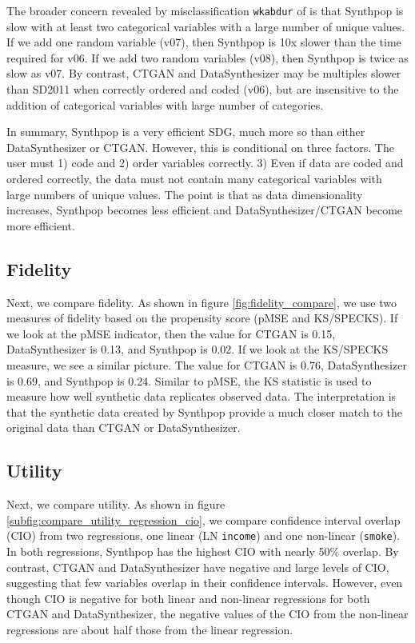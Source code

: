 \documentclass[runningheads]{llncs}
\begin{document}
The broader concern revealed by misclassification \texttt{wkabdur} of is that Synthpop is slow with at least two categorical variables with a large number of unique values.  If we add one random variable (v07), then Synthpop is 10x slower than the time required for v06.  If we add two random variables (v08), then Synthpop is twice as slow as v07.  By contrast, CTGAN and DataSynthesizer may be multiples slower than SD2011 when correctly ordered and coded (v06), but are insensitive to the addition of categorical variables with large number of categories.  

In summary, Synthpop is a very efficient SDG, much more so than either DataSynthesizer or CTGAN.  However, this is conditional on three factors.  The user must 1) code and 2) order variables correctly.  3) Even if data are coded and ordered correctly, the data must not contain many categorical variables with large numbers of unique values.  The point is that as data dimensionality increases, Synthpop becomes less efficient and DataSynthesizer/CTGAN become more efficient.

\subsection{Fidelity}

Next, we compare fidelity.  As shown in figure \ref{fig:fidelity_compare}, we use two measures of fidelity based on the propensity score (pMSE and KS/SPECKS).  If we look at the pMSE indicator, then the value for CTGAN is 0.15, DataSynthesizer is 0.13, and Synthpop is 0.02.  If we look at the KS/SPECKS measure, we see a similar picture.  The value for CTGAN is 0.76, DataSynthesizer is 0.69, and Synthpop is 0.24.  Similar to pMSE, the KS statistic is used to measure how well synthetic data replicates observed data.  The interpretation is that the synthetic data created by Synthpop provide a much closer match to the original data than CTGAN or DataSynthesizer.  

\subsection{Utility}

Next, we compare utility.  As shown in figure \ref{subfig:compare_utility_regression_cio}, we compare confidence interval overlap (CIO) from two regressions, one linear (LN \texttt{income}) and one non-linear (\texttt{smoke}).  In both regressions, Synthpop has the highest CIO with nearly 50\% overlap.  By contrast, CTGAN and DataSynthesizer have negative and large levels of CIO, suggesting that few variables overlap in their confidence intervals.  However, even though CIO is negative for both linear and non-linear regressions for both CTGAN and DataSynthesizer, the negative values of the CIO from the non-linear regressions are about half those from the linear regression.  
\end{document}
